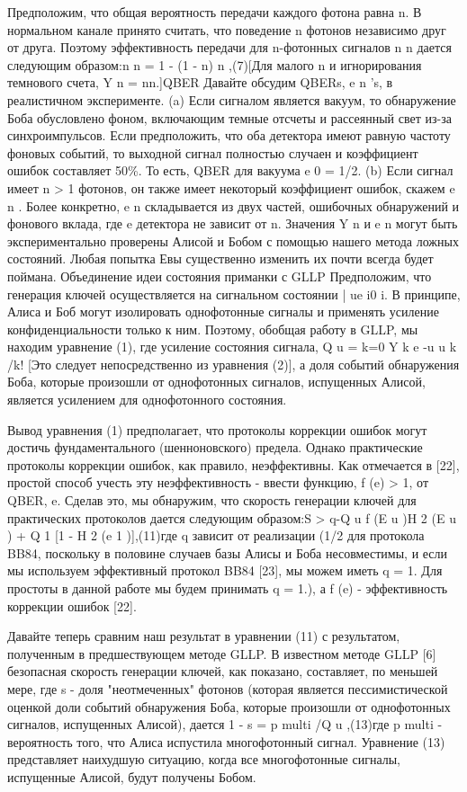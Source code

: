 Предположим, что общая вероятность передачи каждого фотона равна n. В нормальном канале принято считать, что поведение n фотонов независимо друг от друга. Поэтому эффективность передачи для n-фотонных сигналов n n дается следующим образом:n n = 1 - (1 - n) n ,(7)[Для малого n и игнорирования темнового счета, Y n = nn.]QBER Давайте обсудим QBERs, e n 's, в реалистичном эксперименте.
(a) Если сигналом является вакуум, то обнаружение Боба обусловлено фоном, включающим темные отсчеты и рассеянный свет из-за синхроимпульсов. Если предположить, что оба детектора имеют равную частоту фоновых событий, то выходной сигнал полностью случаен и коэффициент ошибок составляет 50\%. То есть, QBER для вакуума e 0 = 1/2.
(b) Если сигнал имеет n > 1 фотонов, он также имеет некоторый коэффициент ошибок, скажем e n . Более конкретно, e n складывается из двух частей, ошибочных обнаружений и фонового вклада, где e детектора не зависит от n.
Значения Y n и e n могут быть экспериментально проверены Алисой и Бобом с помощью нашего метода ложных состояний. Любая попытка Евы существенно изменить их почти всегда будет поймана.
Объединение идеи состояния приманки с GLLP Предположим, что генерация ключей осуществляется на сигнальном состоянии | ue i0 i. В принципе, Алиса и Боб могут изолировать однофотонные сигналы и применять усиление конфиденциальности только к ним. Поэтому, обобщая работу в GLLP, мы находим уравнение (1), где усиление состояния сигнала, Q u = k=0 Y k e -u u k /k! [Это следует непосредственно из уравнения (2)], а доля событий обнаружения Боба, которые произошли от однофотонных сигналов, испущенных Алисой, является усилением для однофотонного состояния.

Вывод уравнения (1) предполагает, что протоколы коррекции ошибок могут достичь фундаментального (шенноновского) предела.
Однако практические протоколы коррекции ошибок, как правило, неэффективны. Как отмечается в [22], простой способ учесть эту неэффективность - ввести функцию, f (e) > 1, от QBER, e. Сделав это, мы обнаружим, что скорость генерации ключей для практических протоколов дается следующим образом:S > q{-Q u f (E u )H 2 (E u ) + Q 1 [1 - H 2 (e 1 )]},(11)где q зависит от реализации (1/2 для протокола BB84, поскольку в половине случаев базы Алисы и Боба несовместимы, и если мы используем эффективный протокол BB84 [23], мы можем иметь q = 1. Для простоты в данной работе мы будем принимать q = 1.), а f (e) - эффективность коррекции ошибок [22].

Давайте теперь сравним наш результат в уравнении (11) с результатом, полученным в предшествующем методе GLLP. В известном методе GLLP [6] безопасная скорость генерации ключей, как показано, составляет, по меньшей мере, где s - доля "неотмеченных" фотонов (которая является пессимистической оценкой доли событий обнаружения Боба, которые произошли от однофотонных сигналов, испущенных Алисой), дается 1 - s = p multi /Q u ,(13)где p multi - вероятность того, что Алиса испустила многофотонный сигнал. Уравнение (13) представляет наихудшую ситуацию, когда все многофотонные сигналы, испущенные Алисой, будут получены Бобом.

